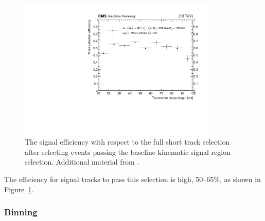     \begin{figure}[h!]
      \centering
      \includegraphics[width=0.85\textwidth]{figures/sigeff_bylength.pdf}
      \caption[Signal efficiency with respect to the short track selection.]
              {The signal efficiency with respect to the full short track selection after selecting events passing the baseline kinematic signal region selection.
                Additional material from \cite{MT2_2019}.}
      \label{fig:distrackssigeff}
    \end{figure}  

    The efficiency for signal tracks to pass this selection is high, 50--65\%, as shown in Figure~\ref{fig:distrackssigeff}.

    \subsubsection{Binning} \label{sec:distracksbinning}

